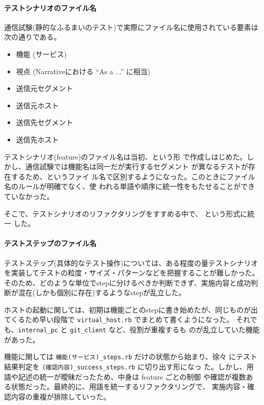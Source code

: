     \paragraph{テストシナリオのファイル名}
通信試験(静的なふるまいのテスト)で実際にファイル名に使用されている要素は
次の通りである。
\begin{itemize}
 \item 機能 (サービス)
 \item 視点 (Narrativeにおける ``As a ...'' に相当)
 \item 送信元セグメント
 \item 送信元ホスト
 \item 送信先セグメント
 \item 送信先ホスト
\end{itemize}
テストシナリオ(feature)のファイル名は当初、という形
で作成しはじめた。しかし、通信試験では機能名は同一だが実行するセグメント
が異なるテストが存在するため、というファイ
ル名で区別するようになった。このときにファイル名のルールが明確でなく、使
われる単語や順序に統一性をもたせることができていなかった。

そこで、テストシナリオのリファクタリングをすすめる中で、 という形式に統一
した。

    \paragraph{テストステップのファイル名}
テストステップ(具体的なテスト操作)については、ある程度の量テストシナリオ
を実装してテストの粒度・サイズ・パターンなどを把握することが難しかった。
そのため、どのような単位でstepに分けるべきか判断できず、実施内容と成功判
断が混在(しかも個別に存在)するようなstepが乱立した。

ホストの起動に関しては、初期は機能ごとのstepに書き始めたが、同じものが出
てくるため早い段階で \verb|virtual_host.rb| でまとめて書くようになった。
それでも、\verb|internal_pc| と \verb|git_client| など、役割が重複するも
のが乱立していた機能があった。

機能に関しては \verb|機能(サービス)_steps.rb| だけの状態から始まり、徐々
にテスト結果判定を \verb|(確認内容)_success_steps.rb| に切り出す形になっ
た。しかし、用語や記述の統一が曖昧だったため、中身は feature ごとの制御
や確認が複数ある状態だった。最終的に、用語を統一するリファクタリングで、
実施内容・確認内容の重複が排除していった。

